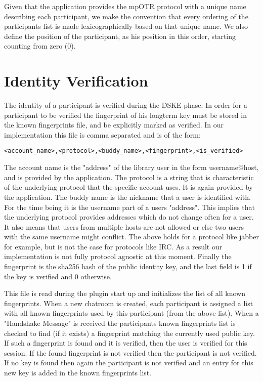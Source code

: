Given that the application provides the mpOTR protocol with a unique name describing each participant, we make the convention that every ordering of the participants list is made lexicographically based on that unique name. We also define the position of the participant, as his position in this order, starting counting from zero (0).

\section{Identity Verification}
The identity of a participant is verified during the DSKE phase.
In order for a participant to be verified the fingerprint of his longterm key must be stored in the known fingerprints file, and be explicitly marked as verified.
In our implementation this file is comma separated and is of the form:

\begin{verbatim}
<account_name>,<protocol>,<buddy_name>,<fingerprint>,<is_verified>
\end{verbatim}

The account name is the "address" of the library user in the form username@host, and is provided by the application.
The protocol is a string that is characteristic of the underlying protocol that the specific account uses.
It is again provided by the application.
The buddy name is the nickname that a user is identified with.
For the time being it is the username part of a users "address".
This implies that the underlying protocol provides addresses which do not change often for a user.
It also means that users from multiple hosts are not allowed or else two users with the same username might conflict.
The above holds for a protocol like jabber for example, but is not the case for protocols like IRC.
As a result our implementation is not fully protocol agnostic at this moment.
Finally the fingerprint is the sha256 hash of the public identity key, and the last field is 1 if the key is verified and 0 otherwise.

This file is read during the plugin start up and initializes the list of all known fingerprints.
When a new chatroom is created, each participant is assigned a list with all known fingerprints used by this participant (from the above list).
When a "Handshake Message" is received the participants known fingerprints list is checked to find (if it exists) a fingerprint matching the currently used public key.
If such a fingerprint is found and it is verified, then the user is verified for this session.
If the found fingerprint is not verified then the participant is not verified.
If no key is found then again the participant is not verified and an entry for this new key is added in the known fingerprints list.

